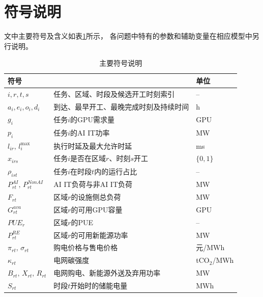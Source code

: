 \section{符号说明}

文中主要符号及含义如表\ref{tab:symbols}所示，
各问题中特有的参数和辅助变量在相应模型中另行说明。

\begin{table}[H]
	\centering
	\caption{主要符号说明}
	\label{tab:symbols}
	
	\small
	\renewcommand{\arraystretch}{0.85}
	
	\begin{tabularx}{0.96\textwidth}{
			>{\centering\arraybackslash}p{}
			>{\raggedright\arraybackslash}X
			>{\centering\arraybackslash}p{}}
		\toprule
		\textbf{符号} & \multicolumn{1}{c}{\textbf{含义}} & \textbf{单位} \\
		\midrule
		
		$i,r,t,s$
		& 任务、区域、时段及候选开工时刻索引
		& -- \\
		
		$a_i,e_i,o_i,d_i$
		& 到达、最早开工、最晚完成时刻及持续时间
		& h \\
		
		$g_i$
		& 任务$i$的GPU需求量
		& GPU \\
		
		$p_i$
		& 任务$i$的AI IT功率
		& MW \\
		
		$l_{ir},\,l_i^{\max}$
		& 执行时延及最大允许时延
		& ms \\
		
		$x_{irs}$
		& 任务$i$是否在区域$r$、时刻$s$开工
		& $\{0,1\}$ \\
		
		$\rho_{ist}$
		& 任务$i$在时段$t$内的运行占比
		& -- \\
		
		$P^{AI}_{rt},\,P^{NonAI}_{rt}$
		& AI IT负荷与非AI IT负荷
		& MW \\
		
		$F_{rt}$
		& 区域$r$的设施侧总负荷
		& MW \\
		
		$G^{ava}_{rt}$
		& 区域$r$的可用GPU容量
		& GPU \\
		
		$PUE_r$
		& 区域$r$的PUE
		& -- \\
		
		$P^{RE}_{rt}$
		& 区域$r$的可用新能源功率
		& MW \\
		
		$\pi_{rt},\,\sigma_{rt}$
		& 购电价格与售电价格
		& 元/MWh \\
		
		$\kappa_{rt}$
		& 电网碳强度
		& tCO$_2$/MWh \\
		
		$B_{rt},\,X_{rt},\,R_{rt}$
		& 电网购电、新能源外送及弃用功率
		& MW \\
		
		$S_{rt}$
		& 时段$t$开始时的储能电量
		& MWh \\
		
		\bottomrule
	\end{tabularx}
\end{table}

